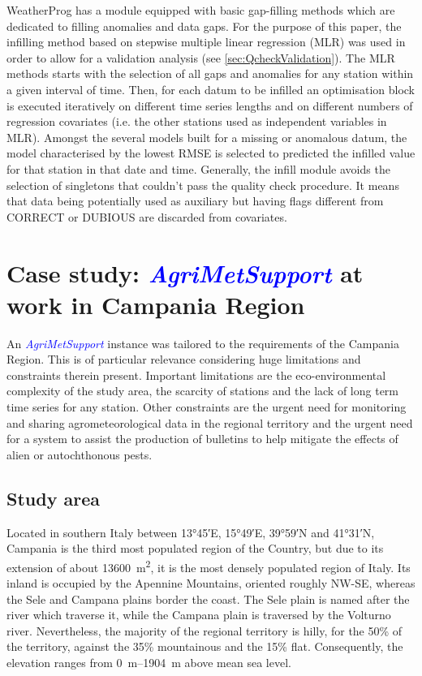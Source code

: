 \documentclass[authoryear,preprint,review,12pt]{elsarticle}
\newcommand{\update}[1]{\emph{\textcolor{blue}{#1}}}
\newcommand{\review}[1]{\emph{\textcolor{cyan}{#1}}}
\newcommand{\gci}{\update{AgriMetSupport}\xspace}
\begin{document}
WeatherProg has a module equipped with basic gap-filling methods which are dedicated to filling anomalies and data gaps.
For the purpose of this paper, the infilling method based on stepwise multiple linear regression (MLR) was used in order to allow for a validation analysis (see \cref{sec:QcheckValidation}).
The MLR methods starts with the selection of all gaps and anomalies for any station within a given  interval of time.
Then, for each datum to be infilled an optimisation block is executed iteratively on different time series lengths and on different numbers of regression covariates (i.e. the other stations used as independent variables in MLR).
Amongst the several models built for a missing or anomalous datum, the model characterised by the lowest RMSE is selected to predicted the infilled value for that station in that date and time.
Generally, the infill module avoids the selection of singletons that couldn't pass the quality check procedure. 
It means that data being potentially used as auxiliary but having flags different from CORRECT or DUBIOUS are discarded from covariates.

\section{Case study: \gci at work in Campania Region} \label{sec:casestudy}

An \gci instance was tailored to the requirements of the Campania Region.
This is of particular relevance considering huge limitations and constraints therein present.
Important limitations are the eco-environmental complexity of the study area, the scarcity of stations and the lack of long term time series for any station.
Other constraints are the urgent need for monitoring and sharing agrometeorological data in the regional territory %
and the urgent need for a system to assist the production of bulletins to help mitigate the effects of alien or autochthonous pests.
 
\subsection{Study area}\label{sec:StudyArea}
Located in southern Italy between \ang{13;45;}E, \ang{15;49;}E, \ang{39;59;}N and \ang{41;31;}N, Campania is the third most populated region of the Country, but due to its extension of about \SI{13600}{\metre\squared}, it is the most densely populated region of Italy.
Its inland is occupied by the Apennine Mountains, oriented roughly NW-SE, whereas the Sele and Campana plains border the coast.
The Sele plain is named after the river which traverse it, while the Campana plain is traversed by the Volturno river.
Nevertheless, the majority of the regional territory is hilly, for the 50\% of the territory, against the 35\% mountainous and the 15\% flat.
Consequently, the elevation ranges from \SIrange{0}{1904}{\metre} above mean sea level.
\end{document}
